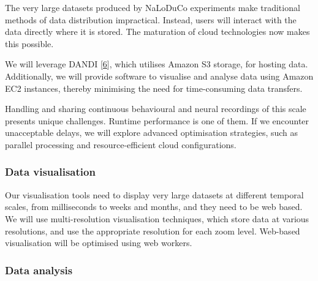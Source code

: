 The very large datasets produced by NaLoDuCo experiments make traditional
methods of data distribution impractical. Instead, users will interact with the
data directly where it is stored. The maturation of cloud technologies now
makes this possible.

We will leverage DANDI [\href{https://www.dandiarchive.org/}{6}], which utilises
Amazon S3 storage, for hosting data. Additionally, we will provide software
to visualise and analyse data using Amazon EC2 instances, thereby minimising
the need for time-consuming data transfers.

Handling and sharing continuous behavioural and neural recordings of this scale
presents unique challenges. Runtime performance is one of them. If we
encounter unacceptable delays, we will explore advanced optimisation
strategies, such as parallel processing and resource-efficient cloud
configurations.

\subsubsection{Data visualisation}

Our visualisation tools need to display very large datasets at different
temporal scales, from milliseconds to weeks and months, and they need to be web
based.
%
We will use multi-resolution visualisation techniques, which store data at
various resolutions, and use the appropriate resolution for each zoom level.
%
Web-based visualisation will be optimised using web workers.


%
%

\subsubsection{Data analysis}

